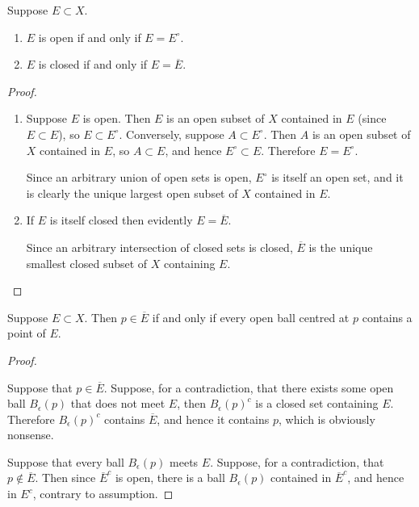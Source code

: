 \begin{proposition}
Suppose $E\subset X$.
\begin{enumerate}[label=(\roman*)]
\item $E$ is open if and only if $E=E^\circ$.
\item $E$ is closed if and only if $E=\overline{E}$.
\end{enumerate}

\end{proposition}

\begin{proof} \
\begin{enumerate}[label=(\roman*)]
\item \fbox{$\implies$} Suppose $E$ is open. Then $E$ is an open subset of $X$ contained in $E$ (since $E\subset E$), so $E\subset E^\circ$. Conversely, suppose $A\subset E^\circ$. Then $A$ is an open subset of $X$ contained in $E$, so $A\subset E$, and hence $E^\circ\subset E$. Therefore $E=E^\circ$.

\fbox{$\impliedby$} Since an arbitrary union of open sets is open, $E^\circ$ is itself an open set, and it is clearly the unique largest open subset of $X$ contained in $E$.

\item \fbox{$\implies$} If $E$ is itself closed then evidently $E=\overline{E}$.

\fbox{$\impliedby$} Since an arbitrary intersection of closed sets is closed, $\overline{E}$ is the unique smallest closed subset of $X$ containing $E$. 
\end{enumerate}
\end{proof}

\begin{proposition}
Suppose $E\subset X$. Then $p\in\overline{E}$ if and only if every open ball centred at $p$ contains a point of $E$.
\end{proposition}

\begin{proof} \

\fbox{$\implies$} Suppose that $p\in\overline{E}$. Suppose, for a contradiction, that there exists some open ball $B_\epsilon(p)$ that does not meet $E$, then $B_\epsilon(p)^c$ is a closed set containing $E$. Therefore $B_\epsilon(p)^c$ contains $\overline{E}$, and hence it contains $p$, which is obviously nonsense.

\fbox{$\impliedby$} Suppose that every ball $B_\epsilon(p)$ meets $E$. Suppose, for a contradiction, that $p\notin\overline{E}$. Then since $\overline{E}^c$ is open, there is a ball $B_\epsilon(p)$ contained in $\overline{E}^c$, and hence in $E^c$, contrary to assumption.
\end{proof}

